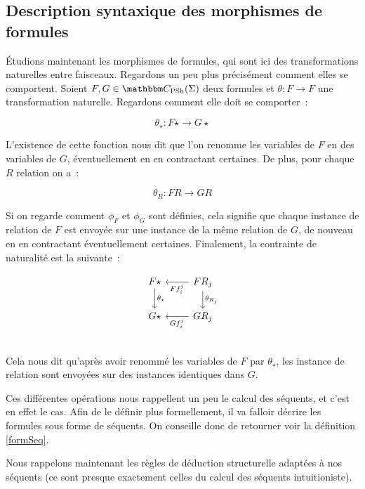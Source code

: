 
\subsection{Description syntaxique des morphismes de formules}

Étudions maintenant les morphismes de formules, qui sont ici des transformations
naturelles entre faisceaux. Regardons un peu plus précisément comment elles se
comportent. Soient $F,G\in\C_\psh(\Sigma)$ deux formules et $\theta:F\rightarrow F$
une transformation naturelle. Regardons comment elle doit se comporter~:

\[ \theta_\star : F\star \rightarrow G\star \]

L'existence de cette fonction nous dit que l'on renomme les variables de $F$ en des
variables de $G$, éventuellement en en contractant certaines. De plus, pour chaque
$R$ relation on a~:

\[ \theta_R : FR\rightarrow GR\]

Si on regarde comment $\phi_F$ et $\phi_G$ sont définies, cela signifie que chaque
instance de relation de $F$ est envoyée sur une instance de la même relation de $G$,
de nouveau en en contractant éventuellement certaines. Finalement, la contrainte
de naturalité est la suivante~:

\[\begin{tikzcd}
    F\star \arrow[d, "\theta_\star"] & FR_j \arrow[l, "Ff_i^j"]
                                            \arrow[d, "\theta_{R_j}"] \\
    G\star & GR_j \arrow[l, "Gf_i^j"] \\
\end{tikzcd}\]

Cela nous dit qu'après avoir renommé les variables de $F$ par $\theta_\star$, les
instance de relation sont envoyées sur des instances identiques dans $G$.

Ces différentes opérations nous rappellent un peu le calcul des séquents, et
c'est en effet le cas. Afin de le définir plus formellement, il va falloir décrire
les formules sous forme de séquents. On conseille donc de retourner voir la
définition \ref{formSeq}.

Nous rappelons maintenant les règles de déduction structurelle adaptées à nos séquents
(ce sont presque exactement celles du calcul des séquents intuitioniste).

